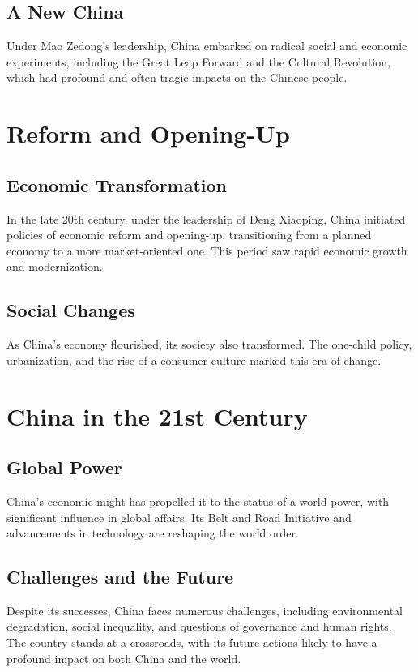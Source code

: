 \documentclass[a4paper,12pt]{book}
\begin{document}
\subsection{A New China}
Under Mao Zedong's leadership, China embarked on radical social and economic experiments, including the Great Leap Forward and the Cultural Revolution, which had profound and often tragic impacts on the Chinese people.

\section{Reform and Opening-Up}
\label{sec:reform-opening-up}
\subsection{Economic Transformation}
In the late 20th century, under the leadership of Deng Xiaoping, China initiated policies of economic reform and opening-up, transitioning from a planned economy to a more market-oriented one. This period saw rapid economic growth and modernization.

\subsection{Social Changes}
As China's economy flourished, its society also transformed. The one-child policy, urbanization, and the rise of a consumer culture marked this era of change.

\section{China in the 21st Century}
\label{sec:china-21st-century}
\subsection{Global Power}
China's economic might has propelled it to the status of a world power, with significant influence in global affairs. Its Belt and Road Initiative and advancements in technology are reshaping the world order.

\subsection{Challenges and the Future}
Despite its successes, China faces numerous challenges, including environmental degradation, social inequality, and questions of governance and human rights. The country stands at a crossroads, with its future actions likely to have a profound impact on both China and the world.
\end{document}
